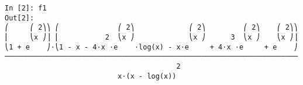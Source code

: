 ﻿\documentclass{article}
\begin{document}
\normalsize
\begin{Verbatim}
In [2]: f1
Out[2]: 
⎛     ⎛ 2⎞⎞ ⎛              ⎛ 2⎞             ⎛ 2⎞         ⎛ 2⎞    ⎛ 2⎞⎞
⎜     ⎝x ⎠⎟ ⎜           2  ⎝x ⎠             ⎝x ⎠      3  ⎝x ⎠    ⎝x ⎠⎟
⎝1 + e    ⎠⋅⎝1 - x - 4⋅x ⋅e    ⋅log(x) - x⋅e     + 4⋅x ⋅e     + e    ⎠
──────────────────────────────────────────────────────────────────────
                                         2                            
                           x⋅(x - log(x))                             
\end{Verbatim}
\end{document}
